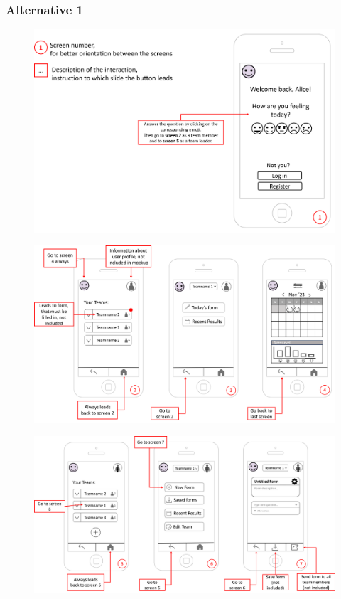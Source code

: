 \documentclass[11pt]{article}
\begin{document}
\subsubsection{Alternative 1}
\begin{figure}[!h]
    \centering
    \includegraphics[width = \textwidth]{figures/Mock Up 1.png}
\end{figure}

\begin{figure}[!h]
    \centering
    \includegraphics[width = \textwidth]{figures/Mock Up 2.png}
\end{figure}

\begin{figure}[!h]
    \centering
    \includegraphics[width = \textwidth]{figures/Mock Up 3.png}
\end{figure}
\clearpage
\end{document}
